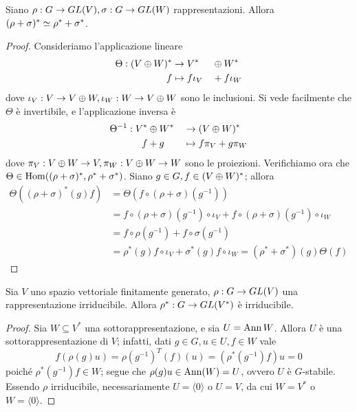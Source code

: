 \begin{proposition}
Siano $\rho:G\to GL(V),\allowbreak\sigma:G\to GL(W)$ rappresentazioni. Allora $(\rho+\sigma)^*\simeq\rho^*+\sigma^*$.
\end{proposition}
\begin{proof}
Consideriamo l'applicazione lineare
\begin{alignat*}{2}
\Theta:(V\oplus W)^*&\to V^*&&\oplus W^*\\
f&\mapsto f\iota_V&&+f\iota_W
\end{alignat*}
dove $\iota_V:V\to V\oplus W,\allowbreak\iota_W:W\to V\oplus W$ sono le inclusioni. Si vede facilmente che $\Theta$ è invertibile, e l'applicazione inversa è
\begin{alignat*}{2}
\Theta^{-1}:V^*&\oplus W^*&&\to(V\oplus W)^*\\
f&+g&&\mapsto f\pi_V+g\pi_W
\end{alignat*}
dove $\pi_V:V\oplus W\to V,\allowbreak\pi_W:V\oplus W\to W$ sono le proiezioni. Verifichiamo ora che $\Theta\in\operatorname{Hom}((\rho+\sigma)^*,\rho^*+\sigma^*)$. Siano $g\in G,f\in(V\oplus W)^*$; allora
\begin{align*}
\Theta((\rho+\sigma)^*(g)f)&=\Theta(f\circ(\rho+\sigma)(g^{-1}))\\
&=f\circ(\rho+\sigma)(g^{-1})\circ\iota_V+f\circ(\rho+\sigma)(g^{-1})\circ\iota_W\\
&=f\circ\rho(g^{-1})+f\circ\sigma(g^{-1})\\
&=\rho^*(g)f\circ\iota_V+\sigma^*(g)f\circ\iota_W=(\rho^*+\sigma^*)(g)\Theta(f)
\end{align*}
\end{proof}

\begin{proposition}
Sia $V$ uno spazio vettoriale finitamente generato, $\rho:G\to GL(V)$ una rappresentazione irriducibile. Allora $\rho^*:G\to GL(V^*)$ è irriducibile.
\end{proposition}
\begin{proof}
Sia $W\subseteq V^*$ una sottorappresentazione, e sia $U=\operatorname{Ann} W$. Allora $U$ è una sottorappresentazione di $V$; infatti, dati $g\in G\comma u\in U\comma f\in W$ vale
$$
f(\rho(g)u)=\rho(g^{-1})^T(f)(u)=(\rho^*(g^{-1})f)u=0
$$
poiché $\rho^*(g^{-1})f\in W$; segue che $\rho(g)u\in\operatorname{Ann}(W)=U$, ovvero $U$ è $G$-stabile. Essendo $\rho$ irriducibile, necessariamente $U=\langle 0\rangle$ o $U=V$, da cui $W=V^*$ o $W=\langle 0\rangle$.
\end{proof}

